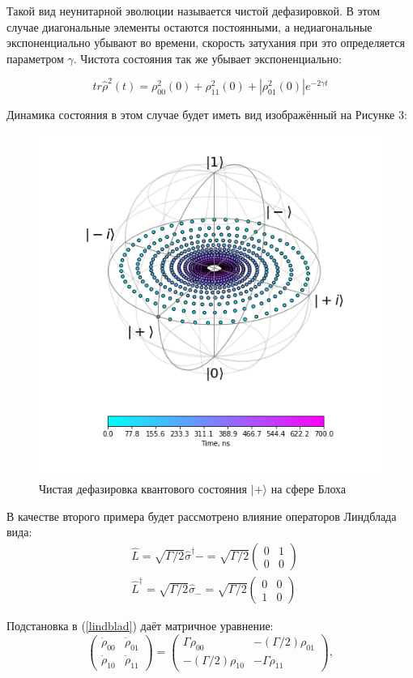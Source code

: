 Такой вид неунитарной эволюции называется чистой дефазировкой. В этом случае диагональные элементы остаются постоянными, а недиагональные экспоненциально убывают во времени, скорость затухания при это определяется параметром $\gamma$. Чистота состояния так же убывает экспоненциально:

\begin{equation}
\tag{23}
tr\hat\rho^2(t) = \rho_{00}^2(0) +\rho_{11}^2(0) + |\rho_{01}^2(0)|e^{-2\gamma t}
\end{equation} 

Динамика состояния в этом случае будет иметь вид изображённый на Рисунке 3:
	
\begin{figure}[h]
	\centering
	\includegraphics[width=0.4\linewidth]{pictures/Puredephase}
	\caption{Чистая дефазировка квантового состояния $|+\rangle$ на сфере Блоха}
	\label{fig:puredephase}
\end{figure}

В качестве второго примера будет рассмотрено влияние операторов Линдблада вида:
\begin{equation}
\label{relaxop}
\tag{24}
\begin{split}
&\hat L = \sqrt{\Gamma/2}\hat\sigma^\dagger- = \sqrt{\Gamma/2}
\begin{pmatrix}
0&1\\0&0
\end{pmatrix}\\
&\hat L^\dagger = \sqrt{\Gamma/2}\hat\sigma_- = \sqrt{\Gamma/2}
\begin{pmatrix}
0&0\\1&0
\end{pmatrix}
\end{split}
\end{equation}

Подстановка в (\ref{lindblad}) даёт матричное уравнение:
\begin{equation}
\tag{25}
\begin{pmatrix}
\dot\rho_{00}&\dot\rho_{01}\\
\dot\rho_{10}&\dot\rho_{11}
\end{pmatrix} =
\begin{pmatrix}
\Gamma\rho_{00}&-(\Gamma/2) \rho_{01}\\
-(\Gamma/2)\rho_{10} & -\Gamma\rho_{11}
\end{pmatrix},
\end{equation}


